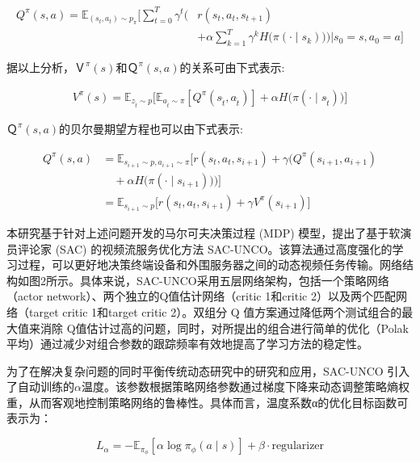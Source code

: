 \begin{equation}
	\begin{aligned}
		Q^{\pi}(s, a) = \mathbb{E}_{(s_t, a_t) \sim p_{\pi}} \Bigg[ 
		\sum_{t=0}^{T} \gamma^t \bigg( &r(s_t, a_t, s_{t+1}) \\
		&+ \alpha \sum_{k=1}^{T} \gamma^k H\big(\pi({\cdot} \mid s_k)\big) \bigg) \Bigg| s_0 = s, a_0 = a \Bigg]
	\end{aligned}
\end{equation}

据以上分析，$Ｖ^π(s)$和$Ｑ^π(s,a)$的关系可由下式表示:

\begin{equation}
	\begin{aligned}
		V^{\pi}(s) = \mathbb{E}_{z_{\hat{t}} \sim p} \Bigg[ 
		\mathbb{E}_{a_{\hat{t}} \sim \pi} \left[ Q^{\pi}(s_{\hat{t}}, a_{\hat{t}}) \right] 
		+ \alpha H\big(\pi({\cdot} \mid s_{\hat{t}})\big) 
		\Bigg]
	\end{aligned}
\end{equation}

$Ｑ^π(s,a)$的贝尔曼期望方程也可以由下式表示:

\begin{align}
	Q^{\pi}(s, a) 
	&= \mathbb{E}_{s_{i+1} \sim p, a_{i+1} \sim \pi} \Big[ r(s_t, a_t, s_{i+1}) + \gamma \Big( Q^{\pi}(s_{i+1}, a_{i+1}) \nonumber \\
	&\quad + \alpha H\big(\pi({\cdot} \mid s_{i+1})\big) \Big) \Big] \nonumber \\
	&= \mathbb{E}_{s_{i+1} \sim p} \Big[ r(s_t, a_t, s_{i+1}) + \gamma V^{\pi}(s_{i+1}) \Big]
\end{align}

本研究基于针对上述问题开发的马尔可夫决策过程 (MDP) 模型，提出了基于软演员评论家 (SAC) 的视频流服务优化方法 SAC-UNCO。该算法通过高度强化的学习过程，可以更好地决策终端设备和外围服务器之间的动态视频任务传输。网络结构如图2所示。具体来说，SAC-UNCO采用五层网络架构，包括一个策略网络（actor network）、两个独立的Q值估计网络（critic 1和critic 2）以及两个匹配网络（target critic 1和target critic 2）。双组分 Q 值方案通过降低两个测试组合的最大值来消除 Q值估计过高的问题，同时，对所提出的组合进行简单的优化（Polak 平均）通过减少对组合参数的跟踪频率有效地提高了学习方法的稳定性。

为了在解决复杂问题的同时平衡传统动态研究中的研究和应用，SAC-UNCO 引入了自动训练的$α$温度。该参数根据策略网络参数通过梯度下降来动态调整策略熵权重，从而客观地控制策略网络的鲁棒性。具体而言，温度系数α的优化目标函数可表示为：

\begin{equation}
	L_{\alpha} = -\mathbb{E}_{\pi_{\phi}} \left[ \alpha \log \pi_{\phi}(a \mid s) \right] + \beta \cdot \text{regularizer}
\end{equation}

